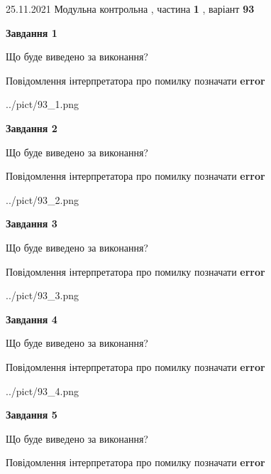 \documentclass[10pt, ukrainian]{article}
\begin{document}
{25.11.2021 Модульна контрольна , частина \textbf { 1 }, варіант  \No \textbf { 93 }\par}
{
\begin {large}

{\begin {center}\textbf{Завдання 1}\end {center}}\par
Що буде виведено за виконання? \par
Повідомлення інтерпретатора про помилку позначати \textbf{error}

\begin{center}
	{../pict/93_1.png}
\end{center}
\newpage

{\begin {center}\textbf{Завдання 2}\end {center}}\par
Що буде виведено за виконання? \par
Повідомлення інтерпретатора про помилку позначати \textbf{error}

\begin{center}
	{../pict/93_2.png}
\end{center}
\newpage

{\begin {center}\textbf{Завдання 3}\end {center}}\par
Що буде виведено за виконання? \par
Повідомлення інтерпретатора про помилку позначати \textbf{error}

\begin{center}
	{../pict/93_3.png}
\end{center}
\newpage

{\begin {center}\textbf{Завдання 4}\end {center}}\par
Що буде виведено за виконання? \par
Повідомлення інтерпретатора про помилку позначати \textbf{error}

\begin{center}
	{../pict/93_4.png}
\end{center}
\newpage

{\begin {center}\textbf{Завдання 5}\end {center}}\par
Що буде виведено за виконання? \par
Повідомлення інтерпретатора про помилку позначати \textbf{error}


\end{large}}
\end{document}
